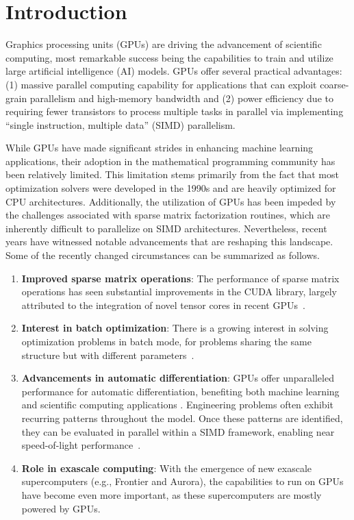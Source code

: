 \section{Introduction}
Graphics processing units (GPUs) are driving the advancement of scientific computing, most remarkable success being the capabilities to train and utilize large artificial intelligence (AI) models.
GPUs offer several practical advantages: (1) massive parallel computing capability for applications that can exploit coarse-grain parallelism and high-memory bandwidth and (2) power efficiency due to requiring fewer transistors to process multiple tasks in parallel via implementing ``single instruction, multiple data'' (SIMD) parallelism.

While GPUs have made significant strides in enhancing machine learning applications, their adoption in the mathematical programming community has been relatively limited.
This limitation stems primarily from the fact that most optimization solvers were developed in the 1990s and are heavily optimized for CPU architectures.
Additionally, the utilization of GPUs has been impeded by the challenges associated with sparse matrix factorization routines, which are inherently difficult to parallelize on SIMD architectures. Nevertheless, recent years have witnessed notable advancements that are reshaping this landscape.
Some of the recently changed circumstances can be summarized as follows.

\begin{enumerate}
  \item \textbf{Improved sparse matrix operations}: The performance of sparse matrix operations has seen substantial improvements in the CUDA library, largely attributed to the integration of novel tensor cores in recent GPUs~\cite{markidis2018nvidia}.
  \item \textbf{Interest in batch optimization}: There is a growing interest in solving optimization problems in batch mode, for problems sharing the same structure but with different parameters~\cite{amos2017optnet,pineda2022theseus}.
  \item \textbf{Advancements in automatic differentiation}: GPUs offer unparalleled performance for automatic differentiation, benefiting both machine learning ~\cite{jax2018github} and scientific computing applications \cite{enzyme2021}. Engineering problems often exhibit recurring patterns throughout the model. Once these patterns are identified, they can be evaluated in parallel within a SIMD framework, enabling near speed-of-light performance~\cite{shin2023accelerating}.
  \item \textbf{Role in exascale computing}: With the emergence of new exascale supercomputers (e.g., Frontier and Aurora), the capabilities to run on GPUs have become even more important, as these supercomputers are mostly powered by GPUs.
\end{enumerate}


